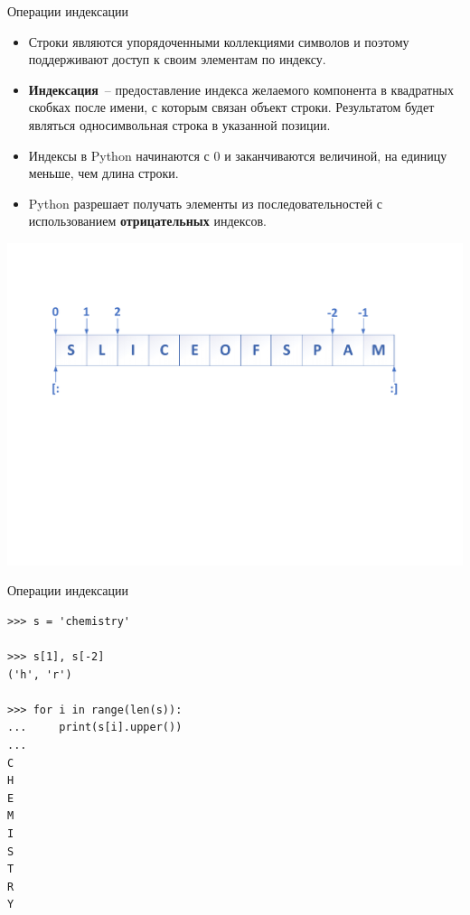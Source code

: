 \documentclass[aspectratio=169, mathserif]{beamer}%
\begin{document}
\begin{frame}[fragile]{Операции индексации}
\scriptsize
\begin{itemize}
\item Строки являются упорядоченными коллекциями символов и поэтому поддерживают доступ к своим элементам по индексу.

\item \textcolor{extraorange}{\textbf{Индексация}}~-- предоставление индекса желаемого компонента в квадратных скобках после имени, с которым связан объект строки. Результатом будет являться односимвольная строка в указанной позиции.

\item Индексы в Python начинаются с 0 и заканчиваются величиной, на единицу меньше, чем длина строки. 

\item Python разрешает получать элементы из последовательностей с использованием \textcolor{extraorange}{\textbf{отрицательных}} индексов.
\end{itemize}

\centering
\includegraphics[width=.75\linewidth]{pics/индексы_и_срезы}

\end{frame}


\begin{frame}[fragile]{Операции индексации}

\begin{verbatim}
>>> s = 'chemistry'

>>> s[1], s[-2]
('h', 'r')

>>> for i in range(len(s)):
...     print(s[i].upper())
...
C
H
E
M
I
S
T
R
Y
\end{verbatim}

\vfill
\end{frame}
\end{document}
